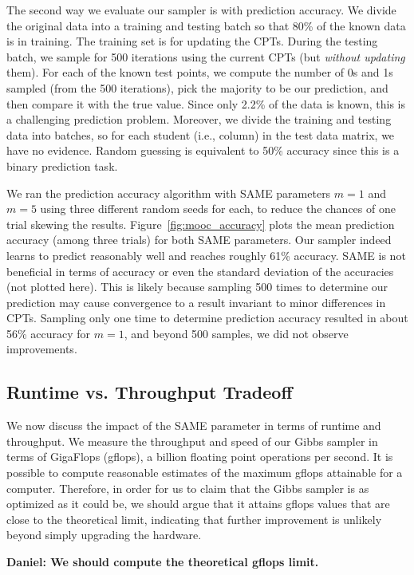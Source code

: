 \documentclass{article} %
\begin{document}
The second way we evaluate our sampler is with prediction accuracy. We divide the original
data into a training and testing batch so that 80\% of the known data is in training. The training
set is for updating the CPTs. During the testing batch, we sample for 500 iterations using the
current CPTs (but \emph{without updating} them). For each of the known test points, we compute the
number of 0s and 1s sampled (from the 500 iterations), pick the majority to be our prediction,
and then compare it with the true value. Since only 2.2\% of the data is known, this is a challenging
prediction problem. Moreover, we divide the training and testing data into batches, so for each
student (i.e., column) in the test data matrix, we have no evidence.  Random guessing is equivalent
to 50\% accuracy since this is a binary prediction task.

We ran the prediction accuracy algorithm with SAME parameters $m=1$ and $m=5$ using three different
random seeds for each, to reduce the chances of one trial skewing the results.
Figure~\ref{fig:mooc_accuracy} plots the mean prediction accuracy (among three trials) for both SAME
parameters. Our sampler indeed learns to predict reasonably well and reaches roughly 61\% accuracy.
SAME is not beneficial in terms of accuracy or even the standard deviation of the accuracies (not
plotted here). This is likely because sampling 500 times to determine our prediction may cause
convergence to a result invariant to minor differences in CPTs.  Sampling only one time to determine
prediction accuracy resulted in about 56\% accuracy for $m=1$, and beyond 500 samples, we did not
observe improvements.

\subsection{Runtime vs. Throughput Tradeoff}\label{ssec:tradeoff}

We now discuss the impact of the SAME parameter in terms of runtime and throughput. We measure the
throughput and speed of our Gibbs sampler in terms of GigaFlops (gflops), a billion floating point
operations per second. It is possible to compute reasonable estimates of the maximum gflops
attainable for a computer. Therefore, in order for us to claim that the Gibbs sampler is as
optimized as it could be, we should argue that it attains gflops values that are close to the
theoretical limit, indicating that further improvement is unlikely beyond simply upgrading the
hardware.

\textbf{Daniel: We should compute the theoretical gflops limit.}
\end{document}

